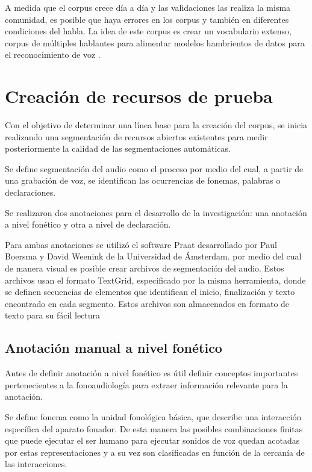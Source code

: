 \documentclass[a4paper,12pt,twoside]{report}
\begin{document}
A medida que el corpus crece día a día y las validaciones las realiza la misma comunidad, es posible que haya errores en los corpus y también en diferentes condiciones del habla. La idea de este corpus es crear un vocabulario extenso, corpus de múltiples hablantes para alimentar modelos hambrientos de datos para el reconocimiento de voz \cite{Common-Voice}.

\chapter{Creación de recursos de prueba}

Con el objetivo de determinar una línea base para la creación del corpus, se inicia realizando una segmentación de recursos abiertos existentes para medir posteriormente la calidad de las segmentaciones automáticas.

Se define segmentación del audio como el proceso por medio del cual, a partir de una grabación de voz, se identifican las ocurrencias de fonemas, palabras o declaraciones. 

Se realizaron dos anotaciones para el desarrollo de la investigación: una anotación a nivel fonético y otra a nivel de declaración.

Para ambas anotaciones se utilizó el software Praat \cite{Praat} desarrollado por Paul Boersma y David Weenink de la Universidad de Ámsterdam. por medio del cual de manera visual es posible crear archivos de segmentación del audio. Estos archivos usan el formato TextGrid, especificado por la misma herramienta, donde se definen secuencias de elementos que identifican el inicio, finalización y texto encontrado en cada segmento. Estos archivos son almacenados en formato de texto para su fácil lectura \cite{TextGrids}

\section{Anotación manual a nivel fonético}

Antes de definir anotación a nivel fonético es útil definir conceptos importantes pertenecientes a la fonoaudiología para extraer información relevante para la anotación.

Se define fonema como la unidad fonológica básica, que describe una interacción específica del aparato fonador. De esta manera las posibles combinaciones finitas que puede ejecutar el ser humano para ejecutar sonidos de voz quedan acotadas por estas representaciones y a su vez son clasificadas en función de la cercanía de las interacciones.
\end{document}
